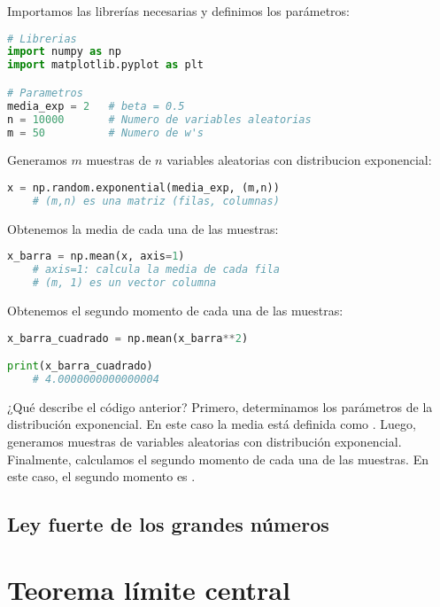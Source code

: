 \documentclass[8pt]{article}
\newcommand{\code}[1]{\texttt{\color{frenchplum}{#1}}}
\begin{document}
\vspace*{0.3cm}

Importamos las librerías necesarias y definimos los parámetros:

\begin{lstlisting}[language=Python]
# Librerias
import numpy as np
import matplotlib.pyplot as plt

# Parametros
media_exp = 2   # beta = 0.5
n = 10000       # Numero de variables aleatorias
m = 50          # Numero de w's
\end{lstlisting}

Generamos $m$ muestras de $n$ variables aleatorias con distribucion exponencial:

\begin{lstlisting}[language=Python]
x = np.random.exponential(media_exp, (m,n))
    # (m,n) es una matriz (filas, columnas)
\end{lstlisting}

Obtenemos la media de cada una de las muestras:

\begin{lstlisting}[language=Python]
x_barra = np.mean(x, axis=1)
    # axis=1: calcula la media de cada fila
    # (m, 1) es un vector columna
\end{lstlisting}

Obtenemos el segundo momento de cada una de las muestras:

\begin{lstlisting}[language=Python]
x_barra_cuadrado = np.mean(x_barra**2)

print(x_barra_cuadrado)
    # 4.0000000000000004
\end{lstlisting}

\vspace*{0.3cm}

¿Qué describe el código anterior? Primero, determinamos los parámetros de la distribución exponencial. En este caso la media está definida como \code{media\_exp = 2}. Luego, generamos \code{m} muestras de \code{n} variables aleatorias con distribución exponencial. Finalmente, calculamos el segundo momento de cada una de las muestras. En este caso, el segundo momento es \code{4.0000000000000004}.





\subsection{Ley fuerte de los grandes números}




\section{Teorema límite central}
\end{document}
